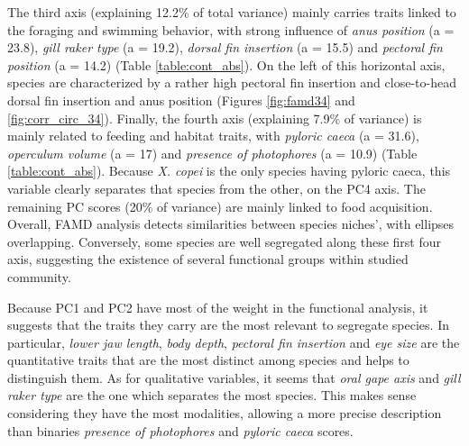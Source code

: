 The third axis (explaining 12.2\% of total variance) mainly carries traits linked to the foraging and swimming behavior, with strong influence of \emph{anus position} (a = 23.8), \emph{gill raker type} (a = 19.2), \emph{dorsal fin insertion} (a = 15.5) and \emph{pectoral fin position} (a = 14.2) (Table \ref{table:cont_abs}). On the left of this horizontal axis, species are characterized by a rather high pectoral fin insertion and close-to-head dorsal fin insertion and anus position (Figures \ref{fig:famd34} and \ref{fig:corr_circ_34}).
Finally, the fourth axis (explaining 7.9\% of variance) is mainly related to feeding and habitat traits, with \emph{pyloric caeca} (a = 31.6), \emph{operculum volume} (a = 17) and \emph{presence of photophores} (a = 10.9) (Table \ref{table:cont_abs}). Because \textit{X. copei} is the only species having pyloric caeca, this variable clearly separates that species from the other, on the PC4 axis. The remaining PC scores (20\% of variance) are mainly linked to food acquisition. Overall, FAMD analysis detects similarities between species niches', with ellipses overlapping. Conversely, some species are well segregated along these first four axis, suggesting the existence of several functional groups within studied community. 

Because PC1 and PC2 have most of the weight in the functional analysis, it suggests that the traits they carry are the most relevant to segregate species. In particular, \emph{lower jaw length}, \emph{body depth}, \emph{pectoral fin insertion} and \emph{eye size} are the quantitative traits that are the most distinct among species and helps to distinguish them. As for qualitative variables, it seems that \emph{oral gape axis} and \emph{gill raker type} are the one which separates the most species. This makes sense considering they have the most modalities, allowing a more precise description than binaries \emph{presence of photophores} and \emph{pyloric caeca} scores. 


